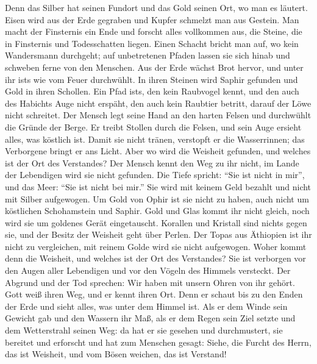  Denn das Silber hat seinen Fundort und das Gold seinen
Ort, wo man es läutert.  Eisen wird aus der Erde gegraben
und Kupfer schmelzt man aus Gestein.  Man macht der
Finsternis ein Ende und forscht alles vollkommen aus, die Steine, die in
Finsternis und Todesschatten liegen.  Einen Schacht bricht
man auf, wo kein Wandersmann durchgeht; auf unbetretenen Pfaden lassen
sie sich hinab und schweben ferne von den Menschen.  Aus
der Erde wächst Brot hervor, und unter ihr ist\textquotesingle s wie vom
Feuer durchwühlt.  In ihren Steinen wird Saphir gefunden
und Gold in ihren Schollen.  Ein Pfad
ist\textquotesingle s, den kein Raubvogel kennt, und den auch des
Habichts Auge nicht erspäht,  den auch kein Raubtier
betritt, darauf der Löwe nicht schreitet.  Der Mensch legt
seine Hand an den harten Felsen und durchwühlt die Gründe der Berge.
 Er treibt Stollen durch die Felsen, und sein Auge
ersieht alles, was köstlich ist.  Damit sie nicht tränen,
verstopft er die Wasserrinnen; das Verborgene bringt er ans Licht.
 Aber wo wird die Weisheit gefunden, und welches ist der
Ort des Verstandes?  Der Mensch kennt den Weg zu ihr
nicht, im Lande der Lebendigen wird sie nicht gefunden. 
Die Tiefe spricht: ``Sie ist nicht in mir'', und das Meer: ``Sie ist
nicht bei mir.''  Sie wird mit keinem Geld bezahlt und
nicht mit Silber aufgewogen.  Um Gold von Ophir ist sie
nicht zu haben, auch nicht um köstlichen Schohamstein und Saphir.
 Gold und Glas kommt ihr nicht gleich, noch wird sie um
goldenes Gerät eingetauscht.  Korallen und Kristall sind
nichts gegen sie, und der Besitz der Weisheit geht über Perlen.
 Der Topas aus Äthiopien ist ihr nicht zu vergleichen,
mit reinem Golde wird sie nicht aufgewogen.  Woher kommt
denn die Weisheit, und welches ist der Ort des Verstandes?
 Sie ist verborgen vor den Augen aller Lebendigen und vor
den Vögeln des Himmels versteckt.  Der Abgrund und der
Tod sprechen: Wir haben mit unsern Ohren von ihr gehört. 
Gott weiß ihren Weg, und er kennt ihren Ort.  Denn er
schaut bis zu den Enden der Erde und sieht alles, was unter dem Himmel
ist.  Als er dem Winde sein Gewicht gab und den Wassern
ihr Maß,  als er dem Regen sein Ziel setzte und dem
Wetterstrahl seinen Weg:  da hat er sie gesehen und
durchmustert, sie bereitet und erforscht  und hat zum
Menschen gesagt: Siehe, die Furcht des Herrn, das ist Weisheit, und vom
Bösen weichen, das ist Verstand!

